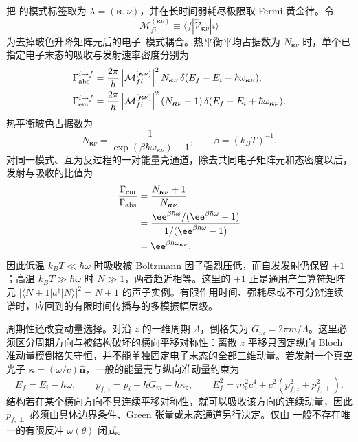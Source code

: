 \begin{exbox}[热声子吸收与发射]
把 的模式标签取为 $\lambda=(\boldsymbol\kappa,\nu)$，并在长时间弱耗尽极限取 Fermi 黄金律。令
\begin{equation*}
 \mathcal M_{fi}^{(\boldsymbol\kappa\nu)}
 \equiv\langle f|\hat{\mathcal V}_{\boldsymbol\kappa\nu}|i\rangle
\end{equation*}
为去掉玻色升降矩阵元后的电子--模式耦合。热平衡平均占据数为 $N_{\boldsymbol\kappa\nu}$ 时，单个已指定电子末态的吸收与发射速率密度分别为
\begin{align*}
\Gamma_{\rm abs}^{i\to f}
&=\frac{2\pi}{\hbar}
\left|\mathcal M_{fi}^{(\boldsymbol\kappa\nu)}\right|^2
N_{\boldsymbol\kappa\nu}\,
\delta(E_f-E_i-\hbar\omega_{\boldsymbol\kappa\nu}),\\
\Gamma_{\rm em}^{i\to f}
&=\frac{2\pi}{\hbar}
\left|\mathcal M_{fi}^{(\boldsymbol\kappa\nu)}\right|^2
(N_{\boldsymbol\kappa\nu}+1)\,
\delta(E_f-E_i+\hbar\omega_{\boldsymbol\kappa\nu}).
\end{align*}
热平衡玻色占据数为
\begin{equation*}
N_{\boldsymbol\kappa\nu}
=\frac{1}{\exp(\beta\hbar\omega_{\boldsymbol\kappa\nu})-1},
\qquad \beta=(k_BT)^{-1}.
\end{equation*}
对同一模式、互为反过程的一对能量壳通道，除去共同电子矩阵元和态密度以后，发射与吸收的比值为
\begin{align*}
\frac{\Gamma_{\rm em}}{\Gamma_{\rm abs}}
&=\frac{N_{\boldsymbol\kappa\nu}+1}{N_{\boldsymbol\kappa\nu}}\\
&=\frac{\ee^{\beta\hbar\omega}/(\ee^{\beta\hbar\omega}-1)}{1/(\ee^{\beta\hbar\omega}-1)}\\
&=\ee^{\beta\hbar\omega_{\boldsymbol\kappa\nu}}.
\end{align*}
因此低温 $k_BT\ll\hbar\omega$ 时吸收被 Boltzmann 因子强烈压低，而自发发射仍保留 $+1$；高温 $k_BT\gg\hbar\omega$ 时 $N\gg1$，两者趋近相等。这里的 $+1$ 正是通用产生算符矩阵元 $|\langle N+1|a^\dagger|N\rangle|^2=N+1$ 的声子实例。有限作用时间、强耗尽或不可分辨连续谱时，应回到的有限时间传播与的多模振幅层级。
\end{exbox}

周期性还改变动量选择。对沿 $z$ 的一维周期 $\Lambda$，倒格矢为 $G_m=2\pi m/\Lambda$。这里必须区分周期方向与被结构破坏的横向平移对称性：离散 $z$ 平移只固定纵向 Bloch 准动量模倒格矢守恒，并不能单独固定电子末态的全部三维动量。若发射一个真空光子
$\boldsymbol\kappa=(\omega/c)\hat{\mathbf n}$，一般的能量壳与纵向准动量约束为
\begin{equation}
\boxed{
E_f=E_i-\hbar\omega,
\qquad
p_{f,z}=p_i-\hbar G_m-\hbar\kappa_z,
\qquad
E_f^2=m_{\mathrm e}^2c^4+c^2\!\left(p_{f,z}^2+p_{f,\perp}^2\right).}
\label{eq:periodic_photon_exact_conservation}
\end{equation}
结构若在某个横向方向不具连续平移对称性，就可以吸收该方向的连续动量，因此 $p_{f,\perp}$ 必须由具体边界条件、Green 张量或末态通道另行决定。仅由 一般不存在唯一的有限反冲 $\omega(\theta)$ 闭式。

